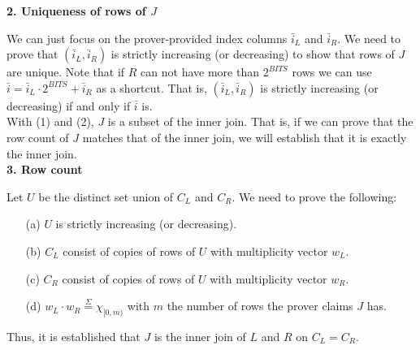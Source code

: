\documentclass[11pt]{article}
\begin{document}
\textbf{2. Uniqueness of rows of $J$}

We can just focus on the prover-provided index columns $\bar{i}_L$ and $\bar{i}_R$. We need to prove that $(\bar{i}_L, \bar{i}_R)$ is strictly increasing (or decreasing) to show that rows of $J$ are unique. Note that if $R$ can not have more than $2^{BITS}$ rows we can use $\bar{i} = \bar{i}_L \cdot 2^{BITS} + \bar{i}_R$ as a shortcut. That is, $(\bar{i}_L, \bar{i}_R)$ is strictly increasing (or decreasing) if and only if $\bar{i}$ is.\\
\noindent With (1) and (2), $J$ is a subset of the inner join. That is, if we can prove that the row count of $J$ matches that of the inner join, we will establish that it is exactly the inner join.\\

\textbf{3. Row count}

Let $U$ be the distinct set union of $C_L$ and $C_R$. We need to prove the following:\\
\begin{enumerate}
\item[(a)] $U$ is strictly increasing (or decreasing).
\item[(b)] $C_L$ consist of copies of rows of $U$ with multiplicity vector $w_L$.
\item[(c)] $C_R$ consist of copies of rows of $U$ with multiplicity vector $w_R$.
\item[(d)] $w_L \cdot w_R \overset{\Sigma}{=} \chi_{[0,m)}$ with $m$ the number of rows the prover claims $J$ has.
\end{enumerate}

Thus, it is established that $J$ is the inner join of $L$ and $R$ on $C_L = C_R$.\\
\end{document}
